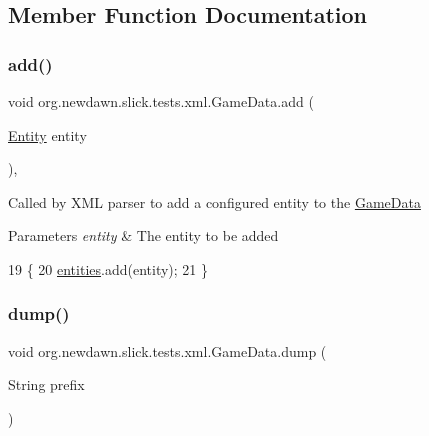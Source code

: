 \subsection{Member Function Documentation}
\mbox{\label{classorg_1_1newdawn_1_1slick_1_1tests_1_1xml_1_1_game_data_a1e590ea2060ee02da4ad3795252c9fdb}} 
\subsubsection{\texorpdfstring{add()}{add()}}
{\footnotesize\ttfamily void org.\+newdawn.\+slick.\+tests.\+xml.\+Game\+Data.\+add (\begin{DoxyParamCaption}\item[{\mbox{\hyperlink{classorg_1_1newdawn_1_1slick_1_1tests_1_1xml_1_1_entity}{Entity}}}]{entity }\end{DoxyParamCaption})\hspace{0.3cm}{\ttfamily [inline]}, {\ttfamily [private]}}

Called by X\+ML parser to add a configured entity to the \mbox{\hyperlink{classorg_1_1newdawn_1_1slick_1_1tests_1_1xml_1_1_game_data}{Game\+Data}}


\begin{DoxyParams}{Parameters}
{\em entity} & The entity to be added \\
\hline
\end{DoxyParams}

\begin{DoxyCode}
19                                     \{
20         \mbox{\hyperlink{namespaceentities}{entities}}.add(entity);
21     \}
\end{DoxyCode}
\mbox{\label{classorg_1_1newdawn_1_1slick_1_1tests_1_1xml_1_1_game_data_aa29ab866fa466f3558b2130fa4f11c3b}} 
\subsubsection{\texorpdfstring{dump()}{dump()}}
{\footnotesize\ttfamily void org.\+newdawn.\+slick.\+tests.\+xml.\+Game\+Data.\+dump (\begin{DoxyParamCaption}\item[{String}]{prefix }\end{DoxyParamCaption})\hspace{0.3cm}{\ttfamily [inline]}}

